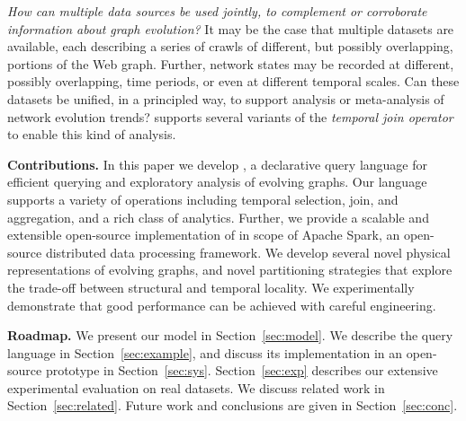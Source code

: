 {\em How can multiple data sources be used jointly, to complement or
  corroborate information about graph evolution?}  It may be the case
that multiple datasets are available, each describing a series of
crawls of different, but possibly overlapping, portions of the Web
graph.  Further, network states may be recorded at different, possibly
overlapping, time periods, or even at different temporal scales.  Can
these datasets be unified, in a principled way, to support analysis or
meta-analysis of network evolution trends?  \ql supports several
variants of the {\em temporal join operator} to enable this kind of
analysis.

{\bf Contributions.} In this paper we develop \ql, a declarative query
language for efficient querying and exploratory analysis of evolving
graphs. Our language supports a variety of operations including
temporal selection, join, and aggregation, and a rich class of
analytics.  Further, we provide a scalable and extensible open-source
implementation of \ql in scope of Apache Spark, an open-source
distributed data processing framework.  We develop several novel
physical representations of evolving graphs, and novel partitioning
strategies that explore the trade-off between structural and temporal
locality.  We experimentally demonstrate that good performance can be
achieved with careful engineering.

{\bf Roadmap.}  We present our model in Section~\ref{sec:model}.  We
describe the \ql query language in Section~\ref{sec:example}, and
discuss its implementation in an open-source prototype in
Section~\ref{sec:sys}.  Section~\ref{sec:exp} describes our extensive
experimental evaluation on real datasets.  We discuss related work in
Section~\ref{sec:related}.  Future work and conclusions are given in
Section~\ref{sec:conc}.

